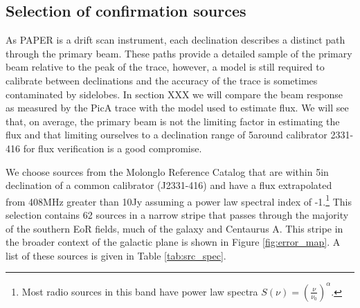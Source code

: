 \documentclass[preprint]{aastex}
\begin{document}
\subsection{Selection of confirmation sources}
As PAPER is a drift scan instrument, each declination describes a distinct path through the primary beam. These paths
provide a detailed sample of the primary beam relative to the peak of the trace, however,
a model is still required to calibrate between declinations and the accuracy of the trace is sometimes contaminated by
sidelobes. In section XXX we will compare the beam response as measured by the PicA trace with the model 
used to estimate flux. We will see that, on average, the primary beam is not the limiting factor in estimating the flux and that
limiting ourselves to a declination range of 5\arcdeg around calibrator 2331-416 for flux verification is a good compromise.
%
%
%
%
%
%

We choose sources from the Molonglo
Reference Catalog \cite[MRC]{Large:1981p7798} that are within 5\arcdeg in
declination of a common calibrator (J2331-416) and have a flux extrapolated
from 408MHz greater than 10Jy assuming a power law spectral index of
-1.\footnote{Most radio sources in this band have power law spectra $S(\nu) =
\left(\frac{\nu}{\nu_0}\right)^\alpha$. } This selection contains 62 sources in a narrow
stripe that passes through the majority of the southern EoR fields, much of the
galaxy and Centaurus A. This stripe in the broader context of the galactic plane
is shown in Figure \ref{fig:error_map}.
A list of these 
sources is given in Table \ref{tab:src_spec}. 
\end{document}
